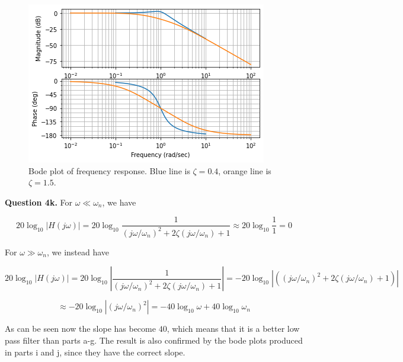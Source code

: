 \documentclass[letterpaper, reqno,11pt]{article}
\begin{document}
\begin{figure}[htbp]
\centering
\includegraphics[width=\textwidth]{q4j}
\caption{Bode plot of frequency response. Blue line is $\zeta=0.4$, orange line is $\zeta=1.5$. }
\label{fig:q4j}
\end{figure}

{\noindent\bf Question 4k.} For $\omega\ll\omega_n$, we have 

\[
    20\log_{10}|H(j\omega)|=20\log_{10}\frac1{(j\omega/\omega_n)^2+2\zeta(j\omega/\omega_n)+1}\approx 20\log_{10}\frac11=0
\]

For $\omega\gg\omega_n$, we instead have 

\[
    20\log_{10}|H(j\omega)|=20\log_{10}|\frac1{(j\omega/\omega_n)^2+2\zeta(j\omega/\omega_n)+1}|=-20\log_{10}|((j\omega/\omega_n)^2+2\zeta(j\omega/\omega_n)+1)|
\]

\[
    \approx-20\log_{10}|(j\omega/\omega_n)^2|=-40\log_{10}\omega+40\log_{10}\omega_n
\]

As can be seen now the slope has become $40$, which means that it is a better low pass filter than parts a-g. The result is also confirmed by the bode plots produced in parts i and j, since they have the correct slope. 
\end{document}
